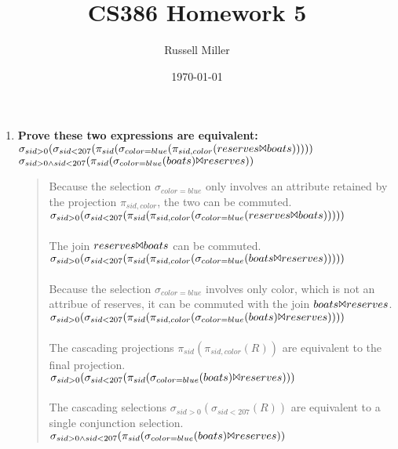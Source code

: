 \documentclass{article}
\title{CS386 Homework 5}
\author{Russell Miller}
\date{\today}
\begin{document}
\maketitle

\begin{enumerate}
\item
\textbf{Prove these two expressions are equivalent:\\}
$\sigma_{sid > 0}(\sigma_{sid < 207}(\pi_{sid}(\sigma_{color=blue}(\pi_{sid,color}(
 reserves \Bowtie boats)))))$\\
$\sigma_{sid > 0 \wedge sid < 207}(\pi_{sid}(\sigma_{color=blue}(
 boats) \Bowtie reserves))$\\

\begin{quote}
Because the selection $\sigma_{color=blue}$ only involves an attribute retained by the
projection $\pi_{sid,color}$, the two can be commuted.\\
$\sigma_{sid > 0}(\sigma_{sid < 207}(\pi_{sid}(\pi_{sid,color}(\sigma_{color=blue}(
 reserves \Bowtie boats)))))$\\
\\
The join $reserves \Bowtie boats$ can be commuted.\\
$\sigma_{sid > 0}(\sigma_{sid < 207}(\pi_{sid}(\pi_{sid,color}(\sigma_{color=blue}(
 boats \Bowtie reserves)))))$\\
\\
Because the selection $\sigma_{color=blue}$ involves only color, which is not an attribue
of reserves, it can be commuted with the join $boats \Bowtie reserves$.\\
$\sigma_{sid > 0}(\sigma_{sid < 207}(\pi_{sid}(\pi_{sid,color}(\sigma_{color=blue}(
 boats) \Bowtie reserves))))$\\
\\
The cascading projections $\pi_{sid}(\pi_{sid,color}(R))$ are equivalent to the final
projection.\\
$\sigma_{sid > 0}(\sigma_{sid < 207}(\pi_{sid}(\sigma_{color=blue}(
 boats) \Bowtie reserves)))$\\
\\
The cascading selections $\sigma_{sid > 0}(\sigma_{sid < 207}(R))$ are equivalent to
a single conjunction selection.\\
$\sigma_{sid > 0 \wedge sid < 207}(\pi_{sid}(\sigma_{color=blue}(
 boats) \Bowtie reserves))$\\
\end{quote}


\end{enumerate}
\end{document}
